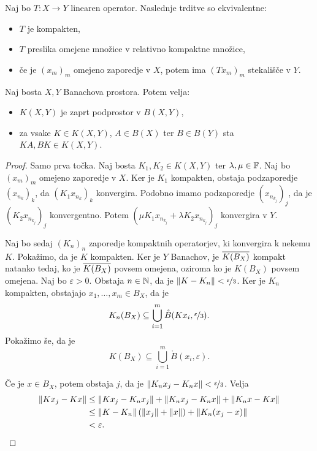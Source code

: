\begin{izrek}
  Naj bo $T: X \to Y$ linearen operator.
  Naslednje trditve so ekvivalentne:
  \begin{itemize}
  \item $T$ je kompakten,
  \item $T$ preslika omejene množice v relativno kompaktne množice,
  \item če je $(x_m)_m$ omejeno zaporedje v $X$, potem ima $(Tx_m)_m$ stekališče
	v $Y$.
  \end{itemize}
\end{izrek}


\begin{trditev}
  Naj bosta $X, Y$ Banachova prostora.
  Potem velja:
  \begin{itemize}
  \item $K(X,Y)$ je zaprt podprostor v $B(X,Y)$,
  \item za vsake $K \in K(X,Y)$, $A \in B(X)$ ter $B \in B(Y)$ sta $KA, BK \in
	K(X,Y)$.
  \end{itemize}
\end{trditev}

\begin{proof}
  Samo prva točka.
  Naj bosta $K_1, K_2 \in K(X,Y)$ ter $\lambda, \mu \in \mathbb{F}$.
  Naj bo $(x_m)_m$ omejeno zaporedje v $X$.
  Ker je $K_1$ kompakten, obstaja podzaporedje $(x_{n_k})_k$, da $(K_1
  x_{n_k})_k$ konvergira.
  Podobno imamo podzaporedje $(x_{n_{k_j}})_j$, da je $(K_2 x_{n_{k_j}})_j$
  konvergentno.
  Potem $(\mu K_1 x_{n_{k_j}} + \lambda K_2 x_{n_{k_j}})_j$ konvergira v $Y$.

  Naj bo sedaj $(K_n)_n$ zaporedje kompaktnih operatorjev, ki konvergira k
  nekemu $K$.
  Pokažimo, da je $K$ kompakten.
  Ker je $Y$ Banachov, je $\overline{K(B_X)}$ kompakt natanko tedaj, ko je
  $\overline{K(B_X)}$ povsem omejena, oziroma ko je $K(B_X)$ povsem omejena.
  Naj bo $\varepsilon > 0$.
  Obstaja $n \in \mathbb{N}$, da je $\left\lVert K - K_n\right\rVert < \nicefrac{\varepsilon}{3}$.
  Ker je $K_n$ kompakten, obstajajo $x_1, \ldots, x_m \in B_X$, da je
  \[
	K_n(B_X) \subseteq \bigcup_{i=1}^m \mathring{B}(Kx_i,
	\nicefrac{\varepsilon}{3}).
  \]
  Pokažimo še, da je
  \[
	K(B_X) \subseteq \bigcup_{i=1}^m \mathring{B}(x_i, \varepsilon).
  \]

  Če je $x \in B_X$, potem obstaja $j$, da je $\left\lVert K_n x_j - K_n x\right\rVert <
  \nicefrac{\varepsilon}{3}$.
  Velja
  \begin{align*}
	\left\lVert K x_j - K x\right\rVert
	&\le \left\lVert K x_j - K_n x_j\right\rVert + \left\lVert K_n x_j - K_n x\right\rVert + \left\lVert K_n x - Kx\right\rVert \\
	&\le \left\lVert K - K_n\right\rVert (\left\lVert x_j\right\rVert + \left\lVert x\right\rVert) + \left\lVert K_n(x_j - x)\right\rVert \\
	&< \varepsilon.
	  \qedhere
  \end{align*}
\end{proof}

